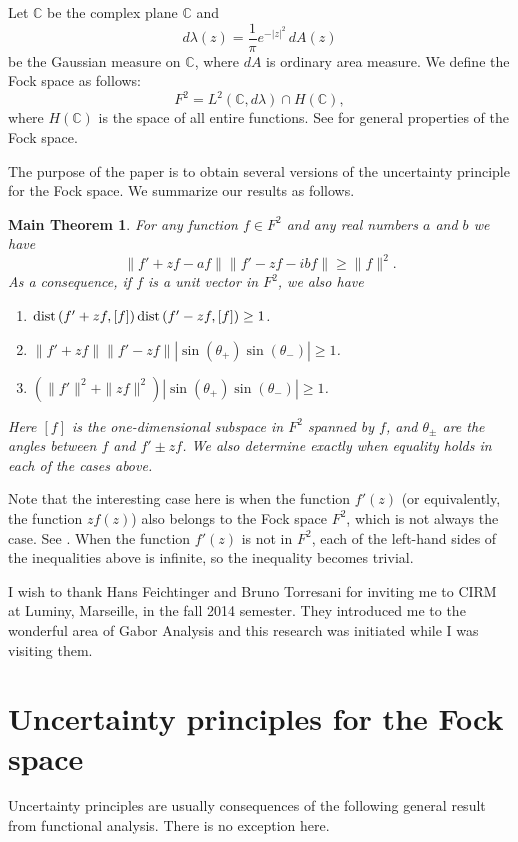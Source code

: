 \documentclass[12pt,reqno]{amsart}
\newtheorem*{mthm}{Main Theorem}
\begin{document}
Let ${{\mathbb C}}$ be the complex plane ${{\mathbb C}}$ and
$$d\lambda(z)=\frac1\pi e^{-|z|^2}\,dA(z)$$
be the Gaussian measure on ${{\mathbb C}}$, where $dA$ is ordinary area measure. We define the Fock space as follows: 
$$F^2=L^2({{\mathbb C}},d\lambda)\cap H({{\mathbb C}}),$$
where $H({{\mathbb C}})$ is the space of all entire functions. See \cite{Z} for general properties of the Fock space.

The purpose of the paper is to obtain several versions of the uncertainty principle for the Fock space.
We summarize our results as follows.

\begin{mthm}
For any function $f\in F^2$ and any real numbers $a$ and $b$ we have
$$\|f'+zf-af\|\|f'-zf-ibf\|\ge\|f\|^2.$$
As a consequence, if $f$ is a unit vector in $F^2$, we also have
\begin{enumerate}
\item[(a)] ${{\rm dist}\,}(f'+zf,[f])\,{{\rm dist}\,}(f'-zf,[f])\ge1$.
\smallskip
\item[(b)] $\|f'+zf\|\|f'-zf\||\sin(\theta_+)\sin(\theta_-)|\ge1$.
\smallskip
\item[(c)] $(\|f'\|^2+\|zf\|^2)|\sin(\theta_+)\sin(\theta_-)|\ge1$.
\end{enumerate}
Here $[f]$ is the one-dimensional subspace in $F^2$ spanned by $f$, and $\theta_{\pm}$ are the angles
between $f$ and $f'\pm zf$. We also determine exactly when equality holds in each of the cases above.
\end{mthm}

Note that the interesting case here is when the function $f'(z)$ (or equivalently, the function $zf(z)$) also belongs 
to the Fock space $F^2$, which is not always the case. See \cite{CZ}. When the function $f'(z)$ is not in $F^2$, 
each of the left-hand sides of the inequalities above is infinite, so the inequality becomes trivial.

I wish to thank Hans Feichtinger and Bruno Torresani for inviting me to CIRM at Luminy, Marseille, in the fall 2014 
semester. They introduced me to the wonderful area of Gabor Analysis and this research was initiated while I
was visiting them.

\section{Uncertainty principles for the Fock space}

Uncertainty principles are usually consequences of the following general result from functional analysis.
There is no exception here.
\end{document}
